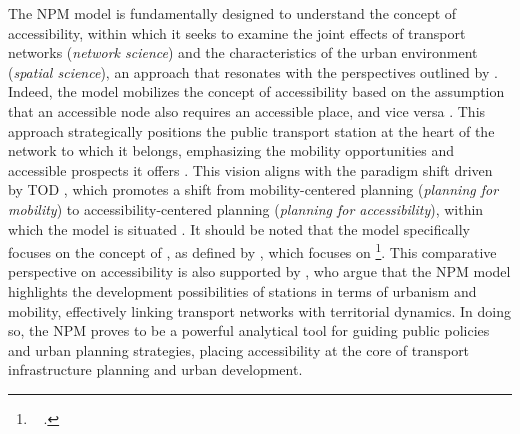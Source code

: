 \begin{refsegment}
The \acrshort{NPM} model is fundamentally designed to understand the concept of accessibility, within which it seeks to examine the joint effects of transport networks (\textsl{network science}) and the characteristics of the urban environment (\textsl{spatial science}), an approach that resonates with the perspectives outlined by \textcolor{blue}{\textcite[300]{ducruet_spatial_2014}}. Indeed, the model mobilizes the concept of accessibility based on the assumption that an accessible node also requires an accessible place, and vice versa \textcolor{blue}{\autocite[203]{bertolini_spatial_1999}}. This approach strategically positions the public transport station at the heart of the network to which it belongs, emphasizing the mobility opportunities and accessible prospects it offers \textcolor{blue}{\autocite[3]{amini_pishro_node_2022}}. This vision aligns with the paradigm shift driven by \acrshort{TOD} \textcolor{blue}{\autocite[75]{banister_sustainable_2008}}, which promotes a shift from mobility-centered planning (\textsl{planning for mobility}) to accessibility-centered planning (\textsl{planning for accessibility}), within which the model is situated \textcolor{blue}{\autocite[496]{caset_measuring_2018}}. It should be noted that the model specifically focuses on the concept of , as defined by \textcolor{blue}{\textcite[27]{dalvi_measurement_1976}}, which focuses on \footnote{~
     \textcolor{blue}{\autocite[27]{dalvi_measurement_1976}}.
}. This comparative perspective on accessibility is also supported by \textcolor{blue}{\textcite[521]{caset_measuring_2018}}, who argue that the \acrshort{NPM} model highlights the development possibilities of stations in terms of urbanism and mobility, effectively linking transport networks with territorial dynamics. In doing so, the \acrshort{NPM} proves to be a powerful analytical tool for guiding public policies and urban planning strategies, placing accessibility at the core of transport infrastructure planning and urban development.%


\end{refsegment}
